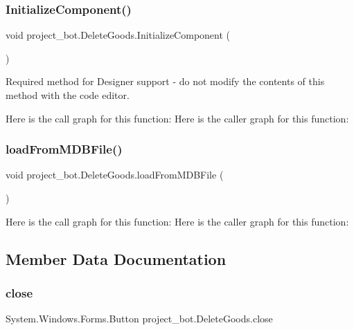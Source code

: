 \subsubsection{\texorpdfstring{Initialize\+Component()}{InitializeComponent()}}
{\footnotesize\ttfamily void project\+\_\+bot.\+Delete\+Goods.\+Initialize\+Component (\begin{DoxyParamCaption}{ }\end{DoxyParamCaption})\hspace{0.3cm}{\ttfamily [private]}}



Required method for Designer support -\/ do not modify the contents of this method with the code editor. 

Here is the call graph for this function\+:
Here is the caller graph for this function\+:
\mbox{\label{classproject__bot_1_1_delete_goods_abab9edf8ed6cdf9465263e469fad0e0b}} 
\subsubsection{\texorpdfstring{load\+From\+M\+D\+B\+File()}{loadFromMDBFile()}}
{\footnotesize\ttfamily void project\+\_\+bot.\+Delete\+Goods.\+load\+From\+M\+D\+B\+File (\begin{DoxyParamCaption}{ }\end{DoxyParamCaption})}

Here is the call graph for this function\+:
Here is the caller graph for this function\+:


\subsection{Member Data Documentation}
\mbox{\label{classproject__bot_1_1_delete_goods_ad5c2713af495340b59f923cd20340ffc}} 
\subsubsection{\texorpdfstring{close}{close}}
{\footnotesize\ttfamily System.\+Windows.\+Forms.\+Button project\+\_\+bot.\+Delete\+Goods.\+close\hspace{0.3cm}{\ttfamily [private]}}

